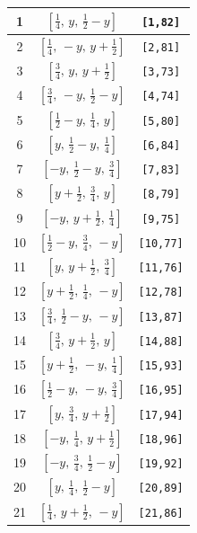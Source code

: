 \documentclass[fleqn,8pt]{jsarticle}
\begin{document}
\begin{longtable}{ccc}
1 & $\left[ \frac{1}{4},\, y,\, \frac{1}{2} - y \right]$ & {\tt [1,82]} \\ \hline
2 & $\left[ \frac{1}{4},\, - y,\, y + \frac{1}{2} \right]$ & {\tt [2,81]} \\ \hline
3 & $\left[ \frac{3}{4},\, y,\, y + \frac{1}{2} \right]$ & {\tt [3,73]} \\ \hline
4 & $\left[ \frac{3}{4},\, - y,\, \frac{1}{2} - y \right]$ & {\tt [4,74]} \\ \hline
5 & $\left[ \frac{1}{2} - y,\, \frac{1}{4},\, y \right]$ & {\tt [5,80]} \\ \hline
6 & $\left[ y,\, \frac{1}{2} - y,\, \frac{1}{4} \right]$ & {\tt [6,84]} \\ \hline
7 & $\left[ - y,\, \frac{1}{2} - y,\, \frac{3}{4} \right]$ & {\tt [7,83]} \\ \hline
8 & $\left[ y + \frac{1}{2},\, \frac{3}{4},\, y \right]$ & {\tt [8,79]} \\ \hline
9 & $\left[ - y,\, y + \frac{1}{2},\, \frac{1}{4} \right]$ & {\tt [9,75]} \\ \hline
10 & $\left[ \frac{1}{2} - y,\, \frac{3}{4},\, - y \right]$ & {\tt [10,77]} \\ \hline
11 & $\left[ y,\, y + \frac{1}{2},\, \frac{3}{4} \right]$ & {\tt [11,76]} \\ \hline
12 & $\left[ y + \frac{1}{2},\, \frac{1}{4},\, - y \right]$ & {\tt [12,78]} \\ \hline
13 & $\left[ \frac{3}{4},\, \frac{1}{2} - y,\, - y \right]$ & {\tt [13,87]} \\ \hline
14 & $\left[ \frac{3}{4},\, y + \frac{1}{2},\, y \right]$ & {\tt [14,88]} \\ \hline
15 & $\left[ y + \frac{1}{2},\, - y,\, \frac{1}{4} \right]$ & {\tt [15,93]} \\ \hline
16 & $\left[ \frac{1}{2} - y,\, - y,\, \frac{3}{4} \right]$ & {\tt [16,95]} \\ \hline
17 & $\left[ y,\, \frac{3}{4},\, y + \frac{1}{2} \right]$ & {\tt [17,94]} \\ \hline
18 & $\left[ - y,\, \frac{1}{4},\, y + \frac{1}{2} \right]$ & {\tt [18,96]} \\ \hline
19 & $\left[ - y,\, \frac{3}{4},\, \frac{1}{2} - y \right]$ & {\tt [19,92]} \\ \hline
20 & $\left[ y,\, \frac{1}{4},\, \frac{1}{2} - y \right]$ & {\tt [20,89]} \\ \hline
21 & $\left[ \frac{1}{4},\, y + \frac{1}{2},\, - y \right]$ & {\tt [21,86]} \\ \hline

\end{longtable}
\end{document}
